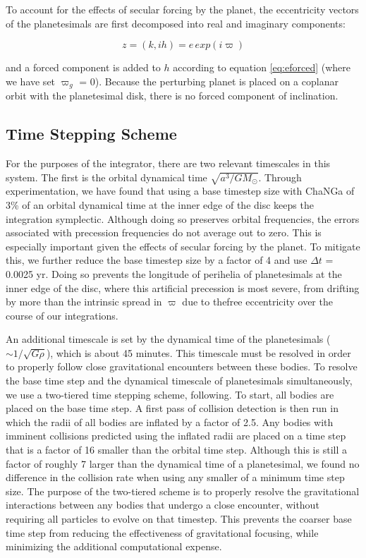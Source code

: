 To account for the effects of secular forcing by the planet, the eccentricity vectors of the planetesimals are first decomposed into 
real and imaginary components:

\begin{equation}\label{eq:kh}
	z = (k, ih) = e \, exp(i \varpi)
\end{equation}

\noindent and a forced component is added to $h$ according to equation \ref{eq:eforced} (where we have set $\varpi_{g}$ = 0). Because the perturbing planet is placed on a coplanar orbit with the planetesimal disk, there is no forced component of inclination.

\subsection{Time Stepping Scheme}\label{sec:timestep}

For the purposes of the integrator, there are two relevant timescales in this system. The first is the orbital dynamical time 
$\sqrt{a^3/G M_{\odot}}$. Through experimentation, we have found that using a base timestep size with {\sc ChaNGa} of 3\% of 
an orbital dynamical time at the inner edge of the disc keeps the integration symplectic. Although doing so preserves orbital 
frequencies, the errors associated with precession frequencies do not average out to zero. This is especially important given the 
effects of secular forcing by the planet. To mitigate this, we further reduce the base timestep size by a factor of 4 and use $\Delta 
t$ = 0.0025 yr. Doing so prevents the longitude of perihelia of planetesimals at the inner edge of the disc, where this artificial 
precession is most severe, from drifting by more than the intrinsic spread in $\varpi$ due to thefree eccentricity over the course 
of our integrations.

An additional timescale is set by the dynamical time of the planetesimals ($\sim 1/\sqrt{G \rho}$), which is about 45 minutes. This 
timescale must be resolved in order to properly follow close gravitational encounters between these bodies. To resolve the base 
time step and the dynamical timescale of planetesimals simultaneously, we use a two-tiered time stepping scheme, 
following\cite{leinhardt15}. To start, all bodies are placed on the base time step. A first pass of collision detection is then run in 
which the radii of all bodies are inflated by a factor of 2.5. Any bodies with imminent collisions predicted using the inflated radii 
are placed on a time step that is a factor of 16 smaller than the orbital time step. Although this is still a factor of roughly 7 larger 
than the dynamical time of a planetesimal, we found no difference in the collision rate when using any smaller of a minimum time 
step size. The purpose of the two-tiered scheme is to properly resolve the gravitational interactions between any bodies that 
undergo a close encounter, without requiring all particles to evolve on that timestep. This prevents the coarser base time step 
from reducing the effectiveness of gravitational focusing, while minimizing the additional computational expense.

